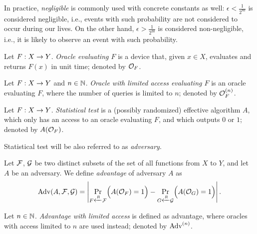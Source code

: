 \begin{note}
\label{note:neglconst}
	In practice, {\em negligible} is commonly used with concrete constants as well: $\epsilon<\frac{1}{2^{80}}$ is considered negligible, i.e., events with such probability are not considered to occur during our lives. On the other hand, $\epsilon>\frac{1}{2^{30}}$ is considered non-negligible, i.e., it is likely to observe an event with such probability.
\end{note}

\begin{defn}[Oracle]
\label{def:oracle}
	Let $F:X\rightarrow Y$. {\em Oracle evaluating $F$} is a device that, given $x\in X$, evaluates and returns $F(x)$ in unit time; denoted by ${\cal O}_F$.
\end{defn}

\begin{defn}   %
\label{def:saoracle}
	Let $F:X\rightarrow Y$ and $n\in\mathbb{N}$. {\em Oracle with limited access evaluating $F$} is an oracle evaluating $F$, where the number of queries is limited to $n$; denoted by ${\cal O}^{(n)}_F$.
\end{defn}

\begin{defn}
\label{def:stattest}
	Let $F:X\rightarrow Y$. {\em Statistical test} is a (possibly randomized) effective algorithm $A$, which only has an access to an oracle evaluating $F$, and which outputs $0$ or $1$; denoted by $A({\cal O}_F)$.
\end{defn}

\begin{note}
	Statistical test will be also referred to as {\em adversary}.
\end{note}

\begin{defn}[Advantage]
\label{def:advant}
	Let $\cal F$, $\cal G$ be two distinct subsets of the set of all functions from $X$ to $Y$, and let $A$ be an adversary. We define {\em advantage} of adversary $A$ as
	\[
		\operatorname*{Adv}(A,{\cal F},{\cal G}) = \left| \Pr\limits_{F\xleftarrow{R} {\cal F}}\Bigl(A({\cal O}_F)=1\Bigr) - \Pr\limits_{G\xleftarrow{R} {\cal G}}\Bigl(A({\cal O}_G)=1\Bigr) \right| .
	\]
\end{defn}

\begin{defn}   %
\label{def:saadvant}
	Let $n\in\mathbb{N}$. {\em Advantage with limited access} is defined as advantage, where oracles with access limited to $n$ are used instead; denoted by ${\operatorname*{Adv}}^{(n)}$.
\end{defn}

